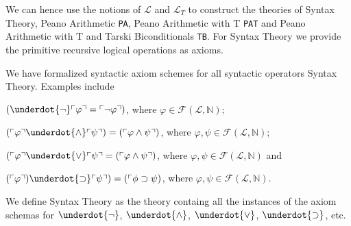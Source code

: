 We can hence use the notions of $\mathcal{L}$ and $\mathcal{L}_T$ to construct the theories of Syntax Theory, Peano Arithmetic \texttt{PA}, Peano Arithmetic with T \texttt{PAT} and Peano Arithmetic with T and Tarski Biconditionals \texttt{TB}. For Syntax Theory we provide the primitive recursive logical operations as axioms.

\begin{definition}\label{def:Syntax-Axioms}
\leanok
{}
We have formalized syntactic axiom schemes for all syntactic operators Syntax Theory. Examples include 

$(\underdot{\neg} \ulcorner \varphi \urcorner = \ulcorner \neg \varphi \urcorner)$, where $\varphi \in \mathcal{F}(\mathcal{L},\mathbb{N})$;

$(\ulcorner \varphi \urcorner \underdot{\wedge} \ulcorner \psi \urcorner) = (\ulcorner \varphi \wedge \psi \urcorner)$, where $\varphi, \psi \in \mathcal{F}(\mathcal{L},\mathbb{N})$;

$(\ulcorner \varphi \urcorner \underdot{\vee} \ulcorner \psi \urcorner = (\ulcorner \varphi \wedge \psi \urcorner)$, where $\varphi, \psi \in \mathcal{F}(\mathcal{L},\mathbb{N})$ and

$(\ulcorner \varphi \urcorner) \underdot{\supset} \ulcorner \psi \urcorner) = (\ulcorner \phi \supset \psi)$, where $\varphi, \psi \in \mathcal{F}(\mathcal{L},\mathbb{N})$.
\end{definition}

\begin{definition}\label{def:Syntax-Theory}
  \leanok
  We define Syntax Theory as the theory containg all the instances of the axiom schemas for $\underdot{\neg}$, $\underdot{\wedge}$, $\underdot{\vee}$, $\underdot{\supset}$, etc.
\end{definition}

